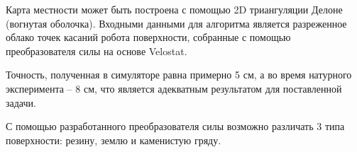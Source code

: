 Карта местности может быть построена с помощью 2D триангуляции Делоне (вогнутая оболочка). Входными данными для алгоритма является разреженное облако точек касаний робота поверхности, собранные с помощью преобразователя силы на основе Velostat.

Точность, полученная в симуляторе равна примерно 5 см, а во время натурного эксперимента -- 8 см, что является адекватным результатом для поставленной задачи.

С помощью разработанного преобразователя силы возможно различать 3 типа поверхности: резину, землю и каменистую гряду.